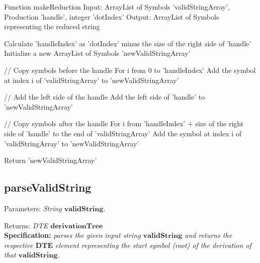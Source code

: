 \vspace{10pt}

\begin{codeblock}
    Function makeReduction
    Input: ArrayList of Symbols 'validStringArray', Production 'handle', integer 'dotIndex'
    Output: ArrayList of Symbols representing the reduced string

    Calculate 'handleIndex' as 'dotIndex' minus the size of the right side of 'handle'
    Initialize a new ArrayList of Symbols 'newValidStringArray'

    // Copy symbols before the handle
    For i from 0 to 'handleIndex'
    Add the symbol at index i of 'validStringArray' to 'newValidStringArray'

    // Add the left side of the handle
    Add the left side of 'handle' to 'newValidStringArray'

    // Copy symbols after the handle
    For i from 'handleIndex' + size of the right side of 'handle' to the end of 'validStringArray'
    Add the symbol at index i of 'validStringArray' to 'newValidStringArray'

    Return 'newValidStringArray'
\end{codeblock}

\vspace{20pt}

\subsection{parseValidString}

Parameters: \textit{String \(\boldsymbol{validString}\).}

Returns: \textit{DTE \(\boldsymbol{derivationTree}\)}\\

\textbf{Specification:} \textit{parses the given input string \(\boldsymbol{validString}\) and returns the respective \(\boldsymbol{DTE}\) element representing the start symbol (root) of the derivation of that \(\boldsymbol{validString}\).}\\

\vspace{10pt}

